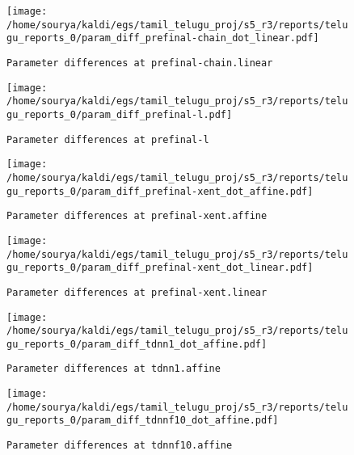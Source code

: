 \documentclass[prl,10pt,twocolumn]{revtex4}
\begin{document}
\newpage
\begin{figure}[h]
  \begin{center}
    \caption{\texttt{Parameter differences at prefinal-chain.linear}}
    \texttt{[image: /home/sourya/kaldi/egs/tamil\_telugu\_proj/s5\_r3/reports/telugu\_reports\_0/param\_diff\_prefinal-chain\_dot\_linear.pdf]}
  \end{center}
\end{figure}
\clearpage


\newpage
\begin{figure}[h]
  \begin{center}
    \caption{\texttt{Parameter differences at prefinal-l}}
    \texttt{[image: /home/sourya/kaldi/egs/tamil\_telugu\_proj/s5\_r3/reports/telugu\_reports\_0/param\_diff\_prefinal-l.pdf]}
  \end{center}
\end{figure}
\clearpage


\newpage
\begin{figure}[h]
  \begin{center}
    \caption{\texttt{Parameter differences at prefinal-xent.affine}}
    \texttt{[image: /home/sourya/kaldi/egs/tamil\_telugu\_proj/s5\_r3/reports/telugu\_reports\_0/param\_diff\_prefinal-xent\_dot\_affine.pdf]}
  \end{center}
\end{figure}
\clearpage


\newpage
\begin{figure}[h]
  \begin{center}
    \caption{\texttt{Parameter differences at prefinal-xent.linear}}
    \texttt{[image: /home/sourya/kaldi/egs/tamil\_telugu\_proj/s5\_r3/reports/telugu\_reports\_0/param\_diff\_prefinal-xent\_dot\_linear.pdf]}
  \end{center}
\end{figure}
\clearpage


\newpage
\begin{figure}[h]
  \begin{center}
    \caption{\texttt{Parameter differences at tdnn1.affine}}
    \texttt{[image: /home/sourya/kaldi/egs/tamil\_telugu\_proj/s5\_r3/reports/telugu\_reports\_0/param\_diff\_tdnn1\_dot\_affine.pdf]}
  \end{center}
\end{figure}
\clearpage


\newpage
\begin{figure}[h]
  \begin{center}
    \caption{\texttt{Parameter differences at tdnnf10.affine}}
    \texttt{[image: /home/sourya/kaldi/egs/tamil\_telugu\_proj/s5\_r3/reports/telugu\_reports\_0/param\_diff\_tdnnf10\_dot\_affine.pdf]}
  \end{center}
\end{figure}
\clearpage
\end{document}
